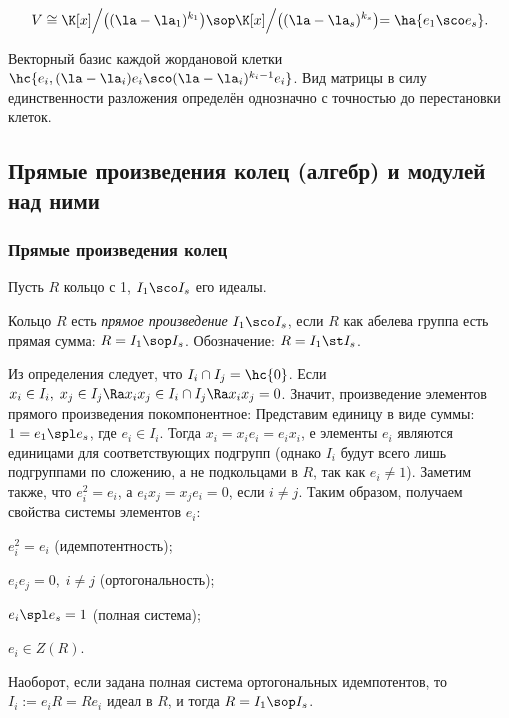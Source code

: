 \documentclass[a4paper]{article}
\begin{document}
$$V \cong \K[x]\Bigl/\bigl((\la - \la_1)^{k_1}\bigl) \sop \K[x]\Bigl/\bigl((\la - \la_s)^{k_s}\bigl) = \ha{e_1 \sco e_s}.$$

Векторный базис каждой жордановой клетки $\hc{e_i, (\la - \la_i) e_i \sco (\la - \la_i)^{k_i-1} e_i}$. Вид матрицы в силу
единственности разложения определён однозначно с точностью до перестановки клеток.

\subsection{Прямые произведения колец (алгебр) и модулей над ними}

\subsubsection{Прямые произведения колец}

Пусть $R$ кольцо с 1, $I_1 \sco I_s$ его идеалы.

\begin{df}
Кольцо $R$ есть \emph{прямое произведение} $I_1 \sco I_s$, если $R$ как абелева группа есть  прямая сумма:
$R= I_1 \sop I_s$. Обозначение: $R= I_1 \st I_s$.
\end{df}

Из определения следует, что $I_i \cap I_j = \hc{0}$. Если $x_i \in I_i, \; x_j \in I_j \Ra x_i x_j \in I_i
\cap I_j \Ra x_i x_j = 0$. Значит, произведение элементов прямого произведения покомпонентное:
Представим единицу в виде суммы: $1=e_1 \spl  e_s$, где $e_i \in I_i$. Тогда $x_i=x_i e_i = e_i x_i$, е элементы $e_i$ являются единицами для
соответствующих подгрупп (однако $I_i$ будут всего лишь подгруппами по сложению, а не подкольцами в $R$, так
как $e_i \neq 1$). Заметим также, что $e_i ^2 = e_i$, а $e_ix_j = x_j e_i = 0$, если $i\neq j$. Таким
образом, получаем свойства системы элементов $e_i$:

 $e_i^2=e_i$ (идемпотентность);

 $e_ie_j=0, \; i \neq j$ (ортогональность);

 $e_i  \spl  e_s =1$ (полная система);

 $e_i  \in Z(R)$.

Наоборот, если задана полная система ортогональных идемпотентов, то $I_i := e_iR = Re_i$ идеал в $R$,  и
тогда $R=I_1 \sop I_s$.
\end{document}

